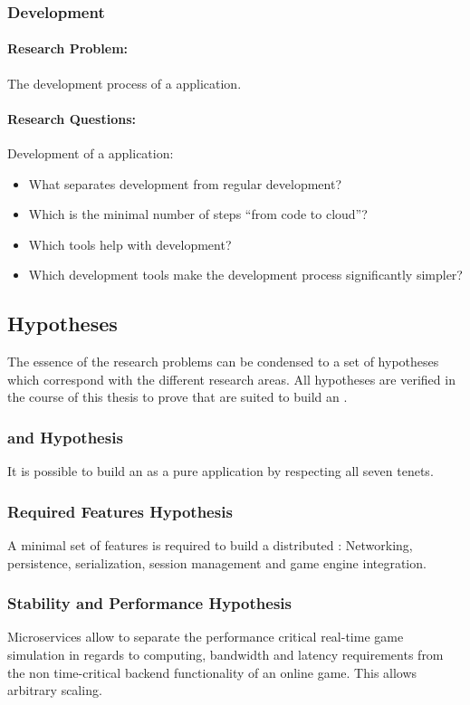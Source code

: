 \subsubsection{\ms{} Development}
\paragraph{Research Problem:} The development process of a \ms{} application.

\paragraph{Research Questions:}

Development of a \ms{} application:
\begin{itemize}
  \item What separates \ms{} development from regular development?
  \item Which is the minimal number of steps ``from code to cloud''?
  \item Which tools help with \ms{} development?
  \item Which development tools make the development process significantly
  simpler?
\end{itemize}

\subsection{Hypotheses}
\label{sub:hypothesis}

The essence of the research problems can be condensed to a set of hypotheses
which correspond with the different research areas. All hypotheses are
verified in the course of this thesis to prove that \mss{} are suited to
build an \og{}. 

\subsubsection{\ogs{} and \mss{} Hypothesis}
It is possible to build an \og{} as a pure \ms{} application by
respecting all seven \ms{} tenets.

\subsubsection{Required Features Hypothesis}
A minimal set of features is required to build a distributed \og{}: Networking,
persistence, serialization, session management and game engine integration.

\subsubsection{Stability and Performance Hypothesis} 
Microservices allow to separate the performance critical real-time game
simulation in regards to computing, bandwidth and latency requirements from the
non time-critical backend functionality of an online game. This allows arbitrary
scaling.

